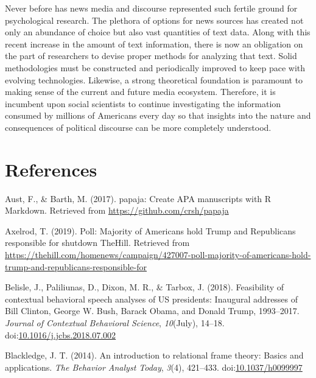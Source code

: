 \documentclass[english,,man]{apa6}
\begin{document}
Never before has news media and discourse represented such fertile ground for psychological research. The plethora of options for news sources has created not only an abundance of choice but also vast quantities of text data. Along with this recent increase in the amount of text information, there is now an obligation on the part of researchers to devise proper methods for analyzing that text. Solid methodologies must be constructed and periodically improved to keep pace with evolving technologies. Likewise, a strong theoretical foundation is paramount to making sense of the current and future media ecosystem. Therefore, it is incumbent upon social scientists to continue investigating the information consumed by millions of Americans every day so that insights into the nature and consequences of political discourse can be more completely understood.

\newpage

\hypertarget{references}{%
\section{References}\label{references}}

\begingroup
\setlength{\parindent}{-0.5in}
\setlength{\leftskip}{0.5in}

\hypertarget{refs}{}
\leavevmode\hypertarget{ref-Aust2017}{}%
Aust, F., \& Barth, M. (2017). papaja: Create APA manuscripts with R Markdown. Retrieved from \url{https://github.com/crsh/papaja}

\leavevmode\hypertarget{ref-Axelrod2019}{}%
Axelrod, T. (2019). Poll: Majority of Americans hold Trump and Republicans responsible for shutdown \textbar{} TheHill. Retrieved from \url{https://thehill.com/homenews/campaign/427007-poll-majority-of-americans-hold-trump-and-republicans-responsible-for}

\leavevmode\hypertarget{ref-Belisle2018}{}%
Belisle, J., Paliliunas, D., Dixon, M. R., \& Tarbox, J. (2018). Feasibility of contextual behavioral speech analyses of US presidents: Inaugural addresses of Bill Clinton, George W. Bush, Barack Obama, and Donald Trump, 1993--2017. \emph{Journal of Contextual Behavioral Science}, \emph{10}(July), 14--18. doi:\href{https://doi.org/10.1016/j.jcbs.2018.07.002}{10.1016/j.jcbs.2018.07.002}

\leavevmode\hypertarget{ref-Blackledge2014}{}%
Blackledge, J. T. (2014). An introduction to relational frame theory: Basics and applications. \emph{The Behavior Analyst Today}, \emph{3}(4), 421--433. doi:\href{https://doi.org/10.1037/h0099997}{10.1037/h0099997}
\end{document}
